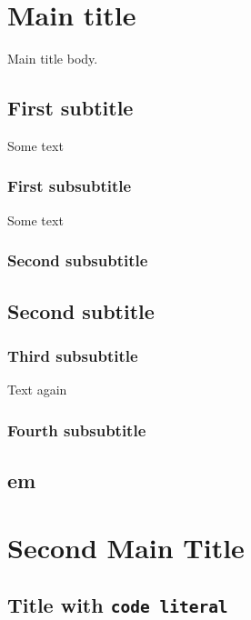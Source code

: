 \chapter{Main title}
Main title body.

\section{First subtitle}
Some text

\subsection{First subsubtitle}
Some text


\subsection{Second subsubtitle}




\section{Second subtitle}

\subsection{Third subsubtitle}
Text again


\subsection{Fourth subsubtitle}



\section{em}


\chapter{Second Main Title}

\section{Title with \verb|code literal|}
